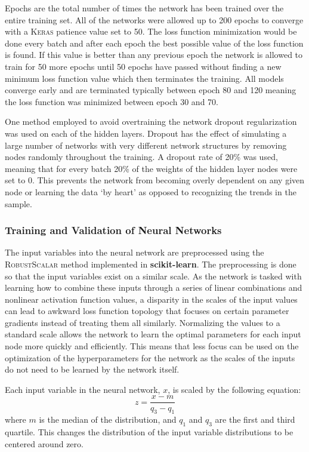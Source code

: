 Epochs are the total number of times the network has been trained over the entire training set.  All of the networks were allowed up to 200 epochs to converge with a \textsc{Keras} patience value set to 50.  The loss function minimization would be done every batch and after each epoch the best possible value of the loss function is found.  If this value is better than any previous epoch the network is allowed to train for 50 more epochs until 50 epochs have passed without finding a new minimum loss function value which then terminates the training.  All models converge early and are terminated typically between epoch 80 and 120 meaning the loss function was minimized between epoch 30 and 70.  

One method employed to avoid overtraining the network dropout regularization was used on each of the hidden layers.  Dropout has the effect of simulating a large number of networks with very different network structures by removing nodes randomly throughout the training. A dropout rate of 20\% was used, meaning that for every batch 20\% of the weights of the hidden layer nodes were set to 0.  This prevents the network from becoming overly dependent on any given node or learning the data `by heart' as opposed to recognizing the trends in the sample. 

\subsubsection{Training and Validation of Neural Networks}

The input variables into the neural network are preprocessed using the \textsc{RobustScalar} method implemented in \textbf{scikit-learn}\cite{ScikitLearn}.  The preprocessing is done so that the input variables exist on a similar scale.  As the network is tasked with learning how to combine these inputs through a series of linear combinations and nonlinear activation function values, a disparity in the scales of the input values can lead to awkward loss function topology that focuses on certain parameter gradients instead of treating them all similarly.  Normalizing the values to a standard scale allows the network to learn the optimal parameters for each input node more quickly and efficiently.  This means that less focus can be used on the optimization of the hyperparameters for the network as the scales of the inputs do not need to be learned by the network itself.

Each input variable in the neural network, $x$, is scaled by the following equation:
\[ z = \frac{x - m }{q_3 - q_1} \]
where $m$ is the median of the distribution, and $q_1$ and $q_3$ are the first and third quartile.  This changes the distribution of the input variable distributions to be centered around zero.

